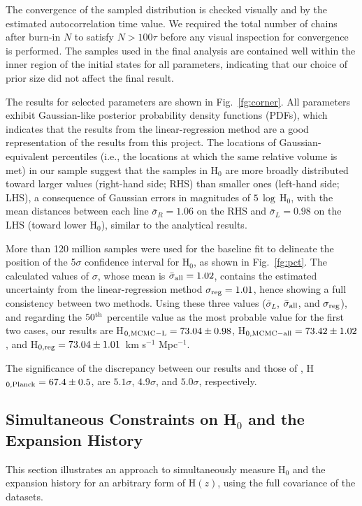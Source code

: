 \documentclass[12pt]{aastex631}
\newcommand{\kms}{km s$^{-1}$ Mpc$^{-1}$}
\begin{document}
The convergence of the sampled distribution is checked visually and by the estimated autocorrelation time value. We required the total number of chains after burn-in $N$ to satisfy $N>100\tau$ before any visual inspection for convergence is performed. The samples used in the final analysis are contained well within the inner region of the initial states for all parameters, indicating that our choice of prior size did not affect the final result.

The results for selected parameters are shown in Fig.~\ref{fg:corner}. All parameters exhibit Gaussian-like posterior probability density functions (PDFs), which indicates that the results from the linear-regression method are a good representation of the results from this project.  The locations of Gaussian-equivalent percentiles (i.e., the locations at which the same relative volume is met) in our sample suggest that the samples in H$_0$ are more broadly distributed toward larger values (right-hand side; RHS) than smaller ones (left-hand side; LHS), a consequence of Gaussian errors in magnitudes of $5\,\log$\,H$_0$, with the mean distances between each line $\bar\sigma_R=1.06$ on the RHS and $\bar\sigma_L=0.98$ on the LHS (toward lower H$_0$), similar to the analytical results.

More than 120 million samples were used for the baseline fit to delineate the position of the 5$\sigma$ confidence interval for H$_0$, as shown in Fig.~\ref{fg:pct}. The calculated values of $\sigma$, whose mean is $\bar\sigma_{\rm{all}}=1.02$, contains the estimated uncertainty from the linear-regression method $\sigma_{\rm{reg}}=1.01$, hence showing a full consistency between two methods. Using these three values ($\bar\sigma_L$, $\bar\sigma_{\rm{all}}$, and $\sigma_{\rm{reg}}$), and regarding the $50^{\rm{th}}$ percentile value as the most probable value for the first two cases, our results are
H$_{0,\rm{MCMC-L}}=73.04\pm0.98$, H$_{0,\rm{MCMC-all}}=73.42\pm1.02$, and H$_{0,\rm{reg}}=73.04\pm1.01$~\kms.

The significance of the discrepancy between our results and those of \cite{Planck:2018}, H$_{0,\rm{Planck}}=67.4\pm0.5$, are $5.1\sigma$, $4.9\sigma$, and $5.0\sigma$, respectively. 

\subsection{Simultaneous Constraints on H$_0$ and the Expansion History\label{sc:5.2}}
  
This section illustrates an approach to simultaneously measure H$_0$ and the expansion history for an arbitrary form of H$(z)$, using the full covariance of the datasets.
  
\end{document}
